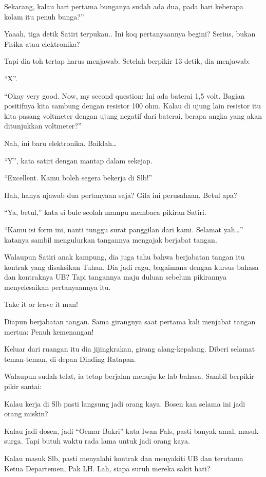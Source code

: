 Sekarang, kalau hari pertama bunganya sudah ada dua, pada hari keberapa kolam itu penuh bunga?”

Yaaah, tiga detik Satiri terpukau.. Ini koq pertanyaannya begini? Serius, bukan Fisika atau elektronika?

Tapi dia toh tertap harus menjawab. Setelah berpikir 13 detik, dia menjawab:

“X”.

“Okay very good. Now, my second question: Ini ada baterai 1,5 volt. Bagian positifnya kita sambung dengan resistor 100 ohm. Kalau di ujung lain resistor itu kita pasang voltmeter dengan ujung negatif dari baterai, berapa angka yang akan ditunjukkan voltmeter?”

Nah, ini baru elektronika. Baiklah…

“Y”, kata satiri dengan mantap dalam sekejap.

“Excellent. Kamu boleh segera bekerja di Slb!”

Hah, hanya njawab dua pertanyaan saja? Gila ini perusahaan. Betul apa?

“Ya, betul,” kata si bule seolah mampu membaca pikiran Satiri.

“Kamu isi form ini, nanti tunggu surat panggilan dari kami. Selamat yah…” katanya sambil mengulurkan tangannya mengajak berjabat tangan.

Walaupun Satiri anak kampung, dia juga tahu bahwa berjabatan tangan itu kontrak yang disaksikan Tuhan. Dia jadi ragu, bagaimana dengan kursus bahasa dan kontraknya UB? Tapi tangannya maju duluan sebelum pikirannya menyelesaikan pertanyaannya itu.

Take it or leave it man!

Diapun berjabatan tangan. Sama girangnya saat pertama kali menjabat tangan mertua: Penuh kemenangan!

Keluar dari ruangan itu dia jijingkrakan, girang alang-kepalang. Diberi selamat teman-teman, di depan Dinding Ratapan.

Walaupun sudah telat, ia tetap berjalan menuju ke lab bahasa. Sambil berpikir-pikir santai:

Kalau kerja di Slb pasti langsung jadi orang kaya. Bosen kan selama ini jadi orang miskin?

Kalau jadi dosen, jadi “Oemar Bakri” kata Iwan Fals, pasti banyak amal, masuk surga. Tapi butuh waktu rada lama untuk jadi orang kaya.

Kalau masuk Slb, pasti menyalahi kontrak dan menyakiti UB dan terutama Ketua Departemen, Pak LH. Lah, siapa suruh mereka sakit hati?

